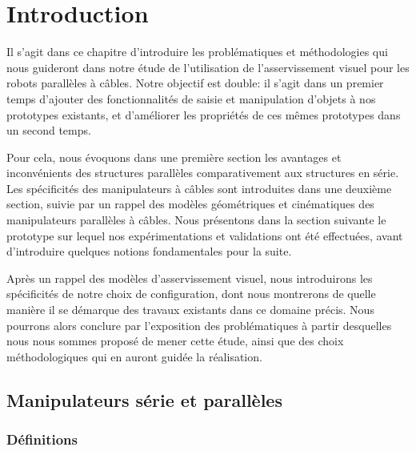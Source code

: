 \section{Introduction}

Il s'agit dans ce chapitre d'introduire les probl\'ematiques et m\'ethodologies qui nous guideront dans notre \'etude de l'utilisation de l'asservissement visuel pour les robots parall\`eles \`a c\^ables. Notre objectif est double: il s'agit dans un premier temps d'ajouter des fonctionnalit\'es de saisie et manipulation d'objets \`a nos prototypes existants, et d'am\'eliorer les propri\'et\'es de ces m\^emes prototypes dans un second temps.

Pour cela, nous  \'evoquons dans une premi\`ere section les avantages et inconv\'enients des structures parall\`eles comparativement aux structures en s\'erie. Les sp\'ecificit\'es des manipulateurs \`a c\^ables sont introduites dans une deuxi\`eme section, suivie par un rappel des mod\`eles g\'eom\'etriques et cin\'ematiques des manipulateurs parall\`eles \`a c\^ables. Nous pr\'esentons dans la section suivante le prototype sur lequel nos exp\'erimentations et validations ont \'et\'e effectu\'ees, avant d'introduire quelques notions fondamentales pour la suite.

Apr\`es un rappel des mod\`eles d'asservissement visuel, nous introduirons les sp\'ecificit\'es de notre choix de configuration, dont nous montrerons de quelle mani\`ere il se d\'emarque des travaux existants dans ce domaine pr\'ecis. Nous pourrons alors conclure par l'exposition des probl\'ematiques \`a partir desquelles nous nous sommes propos\'e de mener cette \'etude, ainsi que des choix m\'ethodologiques qui en auront guid\'ee la r\'ealisation.

\subsection{Manipulateurs s\'erie et parall\`eles}

\subsubsection{D\'efinitions}

